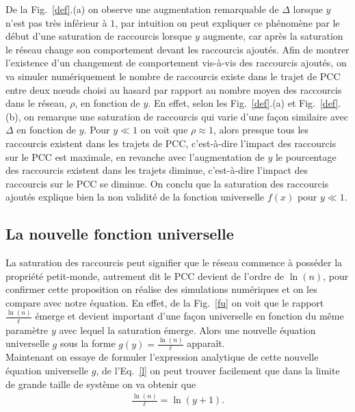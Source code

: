 De la Fig.~\ref{def}.(a) on observe une augmentation remarquable de $\Delta$ lorsque
$y$ n'est pas très inférieur à $1$, par intuition on peut expliquer ce phénomène par le début d'une saturation de raccourcis lorsque $y$ augmente, car après la saturation le réseau change son comportement devant les raccourcis ajoutés. Afin de montrer l'existence d'un changement de comportement vis-à-vis des raccourcis ajoutés, on va simuler numériquement le nombre de raccourcis existe dans le trajet de PCC entre deux nœuds choisi au hasard par rapport au nombre moyen des raccourcis dans le réseau, $\rho$, en fonction de $y$. En effet, selon les Fig.~\ref{def}.(a) et Fig.~\ref{def}.(b), on remarque une saturation de raccourcis qui varie d'une façon similaire avec $\Delta$ en fonction de $y$. Pour $y\ll1$ on voit que $\rho\approx1$, alors presque tous les raccourcis existent dans les trajets de PCC, c'est-à-dire l'impact des raccourcis sur le PCC est maximale, en revanche avec l'augmentation de $y$ le pourcentage des raccourcis existent dans les trajets diminue, c'est-à-dire l'impact des raccourcis sur le PCC se diminue.
On conclu que la saturation des raccourcis ajoutés explique bien la non validité de la fonction universelle $f(x)$ pour  $y\ll1$.\\
 
\subsection{La nouvelle fonction universelle }
La saturation des raccourcis peut signifier que le réseau commence à posséder la propriété petit-monde,
autrement dit le PCC devient de l'ordre de $\ln(n)$, pour confirmer cette proposition on réalise des simulations numériques et on  les compare avec notre équation. En effet, de la Fig.~\ref{fu} on voit que le rapport
$\frac{\ln(n)}{\ell}$ émerge et devient important d'une façon universelle en fonction du même paramètre $y$ avec lequel la saturation émerge. Alors une nouvelle équation universelle $g$ sous la forme $g(y)=\frac{\ln(n)}{\ell}$ apparaît.\\

Maintenant on essaye de formuler l'expression analytique de cette nouvelle équation universelle $g$, de l'Eq.~\eqref{l} on peut trouver facilement que dans la limite de grande taille de système on va obtenir que
\begin{eqnarray}
\frac{\ln(n)}{\ell}=\ln(y+1).
\label{kp1}
\end{eqnarray}

